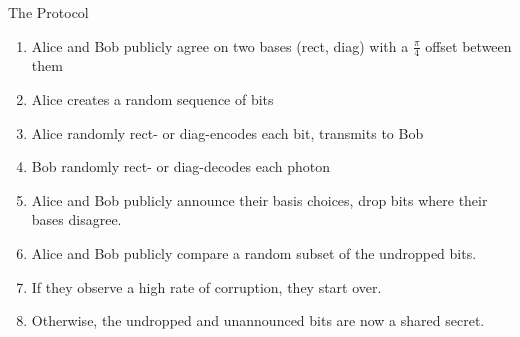 \documentclass[pdf]{beamer}
\begin{document}
\begin{frame}{The Protocol}
  \begin{enumerate}
  \item Alice and Bob publicly agree on two bases (rect, diag) with a
    $\frac{\pi}{4}$ offset between them
  \pause\item Alice creates a random sequence of bits
  \pause\item Alice randomly rect- or diag-encodes each bit, transmits to Bob
  \pause\item Bob randomly rect- or diag-decodes each photon
  \pause\item Alice and Bob publicly announce their basis choices, drop bits where
their bases disagree.
  \pause\item Alice and Bob publicly compare a random subset of the undropped bits.
  \pause\item If they observe a high rate of corruption, they start over.
  \pause\item Otherwise, the undropped and unannounced bits are now a shared secret.
  \end{enumerate}
\end{frame}
\end{document}
